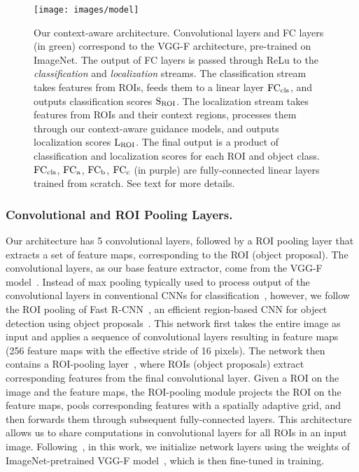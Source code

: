 \documentclass[runningheads]{llncs}
\begin{document}
\begin{figure}[t] \texttt{[image: images/model]} \caption[small]{Our context-aware architecture. 
Convolutional layers and FC layers (in green) correspond to the VGG-F architecture, pre-trained on ImageNet.
The output of FC layers is passed through ReLu to the {\em classification} and {\em localization} streams. 
The classification stream takes features from ROIs, feeds them to a linear layer ${\rm FC_{cls}}$, and outputs classification scores ${\rm S_{ROI}}$. The localization stream takes features from ROIs and their context regions, processes them through our context-aware guidance models, and outputs localization scores ${\rm L_{ROI}}$. The final output is a product of classification and localization scores for each ROI and object class.
${\rm FC_{cls}}$, ${\rm FC_{a}}$, ${\rm FC_{b}}$, ${\rm FC_{c}}$ (in purple) are fully-connected linear layers trained from scratch. See text for more details.
} 
\label{fig:model} 
\end{figure}\subsubsection{Convolutional and ROI Pooling Layers.}Our architecture has 5 convolutional layers, followed by a ROI pooling
layer that extracts a set of feature maps, corresponding to the ROI (object
proposal). The convolutional layers, as our base feature extractor, come from
the VGG-F model~\cite{Chatfield14}. 
 Instead of max pooling typically used to process output of the convolutional layers in conventional
CNNs for classification~\cite{Krizhevsky:2012wl,Oquab:2015us}, however, we
follow the ROI pooling of Fast R-CNN~\cite{Girshick_2015_ICCV}, an efficient
region-based CNN for object detection using object
proposals~\cite{uijlings2013selective}. This network first takes the
entire image as input and applies a sequence of convolutional layers resulting in feature maps (256 feature maps with the effective stride of 16 pixels). The network then contains a ROI-pooling
layer~\cite{He:2014wg}, where ROIs (object proposals) extract corresponding
features from the final convolutional layer. Given a ROI on the image and the
feature maps, the ROI-pooling module projects the ROI on the feature maps, pools
corresponding features with a spatially adaptive grid, and then forwards
them through subsequent fully-connected layers. This architecture allows us to
share computations in convolutional layers for all ROIs in an input image.
Following~\cite{Bilen:2015uo}, in this work, we initialize network layers using the weights of 
ImageNet-pretrained VGG-F model~\cite{Chatfield14}, which is then fine-tuned in training.
\end{document}

